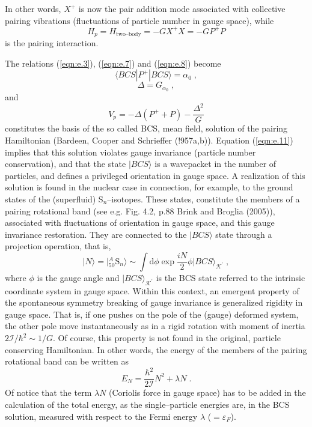 \documentclass[a4paper,onecolumn,superscriptaddress,12pt,nofootinbib,twoside,raggedfooter,notitlepage]{revtex4-1}
\begin{document}
In other words, $X^+$ is now the pair addition mode associated with collective pairing vibrations (fluctuations of particle number in gauge space), while
\begin{equation}
	H_p = H_\textrm{two--body} = -GX^+X = -GP^+P
	\label{eqn:e.10}
\end{equation}
is the pairing interaction.

The relations (\ref{eqn:e.3}), (\ref{eqn:e.7}) and (\ref{eqn:e.8}) become
\begin{equation}
	\langle BCS | P^+ | BCS \rangle = \alpha_0 \;,
	\label{eqn:e.11}
\end{equation}
\begin{equation}
	\Delta = G_{\alpha_0} \;,
	\label{eqn:e.12}
\end{equation}
and
\begin{equation}
	V_p = - \Delta (P^+ + P) - \frac{\Delta^2}{G}
	\label{eqn:e.13}
\end{equation}
constitutes the basis of the so called BCS, mean field, solution of the pairing Hamiltonian (Bardeen, Cooper and Schrieffer (!957a,b)). Equation (\ref{eqn:e.11}) implies that this solution violates gauge invariance (particle number conservation), and that the state $|BCS\rangle$ is a wavepacket in the number of particles, and defines a privileged orientation in gauge space. A realization of this solution is found in the nuclear case in connection, for example, to the ground states of the (superfluid) S${}_n$--isotopes. These states, constitute the members of a pairing rotational band (see e.g. Fig. 4.2, p.88 Brink and Broglia (2005)), associated with fluctuations of orientation in gauge space, and this gauge invariance restoration. They are connected to the $|BCS \rangle$ state through a projection operation, that is,
\begin{equation}
	|N\rangle = | {}^A_{50}\textrm{S}_n \rangle \sim \int \textrm{d}\phi \exp{\frac{i N}{2}\phi} | BCS \rangle_{\mathcal{K}^\prime} \;,
	\label{eqn:e.14}
\end{equation}
where $\phi$ is the gauge angle and $| BCS \rangle_{\mathcal{K}^\prime}$ is the BCS state referred to the intrinsic coordinate system in gauge space. Within this context, an emergent property of the spontaneous symmetry breaking of gauge invariance is generalized rigidity in gauge space. That is, if one pushes on the pole of the (gauge) deformed system, the other pole move instantaneously as in a rigid rotation with moment of inertia $2 \mathcal{I}/\hbar^2 \sim 1/G$. Of course, this property is not found in the original, particle conserving Hamiltonian. In other words, the energy of the members of the pairing rotational band can be written as
\begin{equation}
	E_N = \frac{\hbar^2}{2\mathcal{I}} N^2 + \lambda N \;.
	\label{eqn:e.15}
\end{equation}
Of notice that the term $\lambda N$ (Coriolis force in gauge space) has to be added in the calculation of the total energy, as the single--particle energies are, in the BCS solution, measured with respect to the Fermi energy $\lambda$ ($= \varepsilon_F$).
\end{document}
